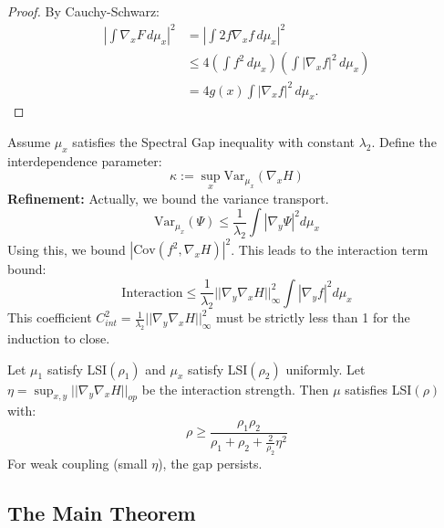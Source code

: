 \begin{proof}
By Cauchy-Schwarz:
\begin{align}
    \left| \int \nabla_x F \, d\mu_x \right|^2 &= \left| \int 2f \nabla_x f \, d\mu_x \right|^2 \\
    &\leq 4 \left( \int f^2 \, d\mu_x \right) \left( \int |\nabla_x f|^2 \, d\mu_x \right) \\
    &= 4g(x) \int |\nabla_x f|^2 \, d\mu_x.
\end{align}
\end{proof}

\begin{lemma}\label{lem:cov-term}
Assume $\mu_x$ satisfies the Spectral Gap inequality with constant $\lambda_2$. Define the interdependence parameter:
\begin{equation}
    \kappa := \sup_x \mathrm{Var}_{\mu_x}(\nabla_x H)
\end{equation}
\textbf{Refinement:} Actually, we bound the variance transport.
\begin{equation}
\mathrm{Var}_{\mu_x}(\Psi) \leq \frac{1}{\lambda_2} \int |\nabla_y \Psi|^2 d\mu_x
\end{equation}
Using this, we bound $|\mathrm{Cov}(f^2, \nabla_x H)|^2$.
This leads to the interaction term bound:
\begin{equation}
\text{Interaction} \le \frac{1}{\lambda_2} || \nabla_y \nabla_x H ||_\infty^2 \int |\nabla_y f|^2 d\mu_x
\end{equation}
This coefficient $C_{int}^2 = \frac{1}{\lambda_2} || \nabla_y \nabla_x H ||_\infty^2$ must be strictly less than 1 for the induction to close.
\end{lemma}

\begin{theorem}
Let $\mu_1$ satisfy LSI$(\rho_1)$ and $\mu_x$ satisfy LSI$(\rho_2)$ uniformly.
Let $\eta = \sup_{x,y} || \nabla_y \nabla_x H||_{op}$ be the interaction strength.
Then $\mu$ satisfies LSI$(\rho)$ with:
\begin{equation}
\rho \ge \frac{\rho_1 \rho_2}{\rho_1 + \rho_2 + \frac{2}{\rho_2} \eta^2}
\end{equation}
For weak coupling (small $\eta$), the gap persists.
\end{theorem}

\subsection{The Main Theorem}

